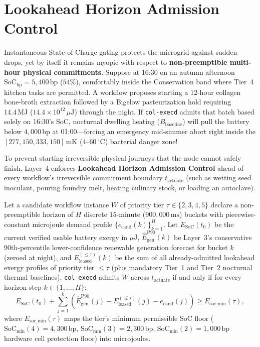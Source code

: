 \section{Lookahead Horizon Admission Control}
\label{sec:ch3-lookahead-admission}

Instantaneous State-of-Charge gating protects the microgrid against sudden drops, yet by
itself it remains myopic with respect to \textbf{non-preemptible multi-hour physical
commitments}. Suppose at 16:30 on an autumn afternoon $\mathrm{SoC}_{\mathrm{bp}} = 5{,}400\,\mathrm{bp}$
($54\%$), comfortably inside the Conservation band where Tier~4 kitchen tasks are permitted.
A workflow proposes starting a $12\text{-hour}$ collagen bone-broth extraction followed by a
Bigelow pasteurization hold requiring $14.4\,\mathrm{MJ}$ ($14.4 \times 10^{12}\,\mu\mathrm{J}$)
through the night. If \texttt{col-execd} admits that batch based solely on 16:30's SoC,
nocturnal dwelling heating ($B_{\mathrm{baseline}}$) will pull the battery below
$4{,}000\,\mathrm{bp}$ at 01:00---forcing an emergency mid-simmer abort right inside the
$[277{,}150, 333{,}150]\,\mathrm{mK}$ ($4\text{--}60\,^\circ\mathrm{C}$) bacterial danger
zone!

To prevent starting irreversible physical journeys that the node cannot safely finish,
Layer~4 enforces \textbf{Lookahead Horizon Admission Control} ahead of every workflow's
irreversible commitment boundary $t_{\mathrm{actuate}}$ (such as wetting seed inoculant,
pouring foundry melt, heating culinary stock, or loading an autoclave).

\begin{definition}
\label{def:ch3-lookahead-gate}
Let a candidate workflow instance $W$ of priority tier $\tau \in \{2,3,4,5\}$ declare a
non-preemptible horizon of $H$ discrete $15\text{-minute}$ ($900{,}000\,\mathrm{ms}$)
buckets with piecewise-constant microjoule demand profile
$\{e_{\mathrm{cand}}(k)\}_{k=1}^{H}$. Let $E_{\mathrm{SoC}}(t_0)$ be the current verified
usable battery exergy in $\mu\mathrm{J}$, $\widehat{E}_{\mathrm{gen}}^{\mathrm{P90}}(k)$ be
Layer~3's conservative 90th-percentile lower-confidence renewable generation forecast for
bucket $k$ (zeroed at night), and $E_{\mathrm{leased}}^{(\le \tau)}(k)$ be the sum of all
already-admitted lookahead exergy profiles of priority tier $\le \tau$ (plus mandatory
Tier~1 and Tier~2 nocturnal thermal baselines). \texttt{col-execd} admits $W$ across
$t_{\mathrm{actuate}}$ if and only if for every horizon step $k \in \{1, \dots, H\}$:
\begin{equation}
E_{\mathrm{SoC}}(t_0) + \sum_{j=1}^{k} \left( \widehat{E}_{\mathrm{gen}}^{\mathrm{P90}}(j) - E_{\mathrm{leased}}^{(\le \tau)}(j) - e_{\mathrm{cand}}(j) \right) \ge E_{\mathrm{soc\_min}}(\tau),
\label{eq:ch3-lookahead}
\end{equation}
where $E_{\mathrm{soc\_min}}(\tau)$ maps the tier's minimum permissible SoC floor
($\mathrm{SoC}_{\mathrm{min}}(4) = 4{,}300\,\mathrm{bp}$, $\mathrm{SoC}_{\mathrm{min}}(3) = 2{,}300\,\mathrm{bp}$,
$\mathrm{SoC}_{\mathrm{min}}(2) = 1{,}000\,\mathrm{bp}$ hardware cell protection floor) into
microjoules.
\end{definition}

